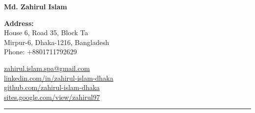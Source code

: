 \documentclass[11pt,a4paper]{article}
\begin{document}
\begin{center}
    {\Huge \textbf{Md. Zahirul Islam}} \\[0.5em]
\end{center}

\begin{multicols}{2}
\noindent
\textbf{Address:} \\
House 6, Road 35, Block Ta \\
Mirpur-6, Dhaka-1216, Bangladesh \\
Phone: +8801711792629 \\

\columnbreak

\noindent
\href{mailto:zahirul.islam.spa@gmail.com}{zahirul.islam.spa@gmail.com} \\
\href{https://www.linkedin.com/in/zahirul-islam-dhaka}{linkedin.com/in/zahirul-islam-dhaka} \\
\href{https://github.com/zahirul-islam-dhaka}{github.com/zahirul-islam-dhaka} \\
\href{https://sites.google.com/view/zahirul97}{sites.google.com/view/zahirul97} \\
\end{multicols}

\hrule

\end{document}
